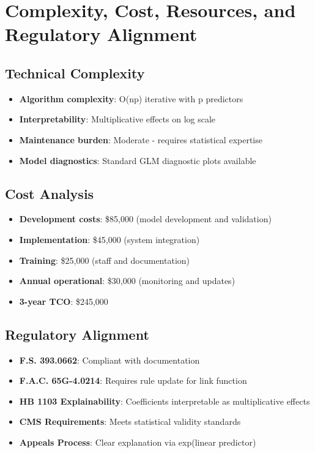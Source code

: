 \section{Complexity, Cost, Resources, and Regulatory Alignment}

\subsection{Technical Complexity}

\begin{itemize}
    \item \textbf{Algorithm complexity}: O(np) iterative with p predictors
    \item \textbf{Interpretability}: Multiplicative effects on log scale
    \item \textbf{Maintenance burden}: Moderate - requires statistical expertise
    \item \textbf{Model diagnostics}: Standard GLM diagnostic plots available
\end{itemize}

\subsection{Cost Analysis}

\begin{itemize}
    \item \textbf{Development costs}: \$85,000 (model development and validation)
    \item \textbf{Implementation}: \$45,000 (system integration)
    \item \textbf{Training}: \$25,000 (staff and documentation)
    \item \textbf{Annual operational}: \$30,000 (monitoring and updates)
    \item \textbf{3-year TCO}: \$245,000
\end{itemize}

\subsection{Regulatory Alignment}

\begin{itemize}
    \item[\greencheck] \textbf{F.S. 393.0662}:   Compliant with documentation
    \item[\yellowwarning] \textbf{F.A.C. 65G-4.0214}:  Requires rule update for link function
    \item[\greencheck] \textbf{HB 1103 Explainability}:   Coefficients interpretable as multiplicative effects
    \item[\greencheck] \textbf{CMS Requirements}:  Meets statistical validity standards
    \item[\greencheck] \textbf{Appeals Process}:   Clear explanation via exp(linear predictor)
\end{itemize}

